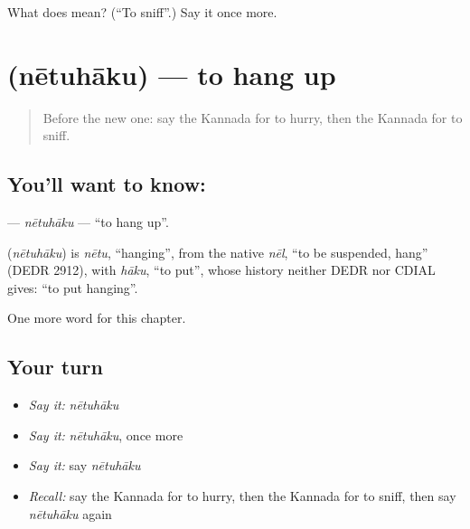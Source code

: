 \begin{tcolorbox}[breakable,colback=teal!4,colframe=teal!35!black,title={Before you move on}]
What does  mean? (\textquotedblleft{}To sniff\textquotedblright{}.) Say it once more.
\end{tcolorbox}
\section[\texorpdfstring{\kn{ನೇತುಹಾಕು} (nētuhāku)}{ನೇತುಹಾಕು (nētuhāku)}]{ (nētuhāku) — to hang up}

\label{lesson:KA-C207-netuhaku}



\begin{quote}
Before the new one: say the Kannada for to hurry, then the Kannada for to sniff.
\end{quote}

\subsection*{You'll want to know: }
\textbf{} — \emph{nētuhāku} — \textquotedblleft{}to hang up\textquotedblright{}.

\begin{cousinweb}
\textbf{} (\emph{nētuhāku}) is \emph{nētu}, \textquotedblleft{}hanging\textquotedblright{}, from the native \emph{nēl}, \textquotedblleft{}to be suspended, hang\textquotedblright{} (DEDR 2912), with \emph{hāku}, \textquotedblleft{}to put\textquotedblright{}, whose history neither DEDR nor CDIAL gives: \textquotedblleft{}to put hanging\textquotedblright{}.
\end{cousinweb}

\begin{grammarlens}[title={What you've built}]
One more word for this chapter.
\end{grammarlens}

\subsection*{Your turn}
\begin{itemize}
\raggedright
  \item \emph{Say it:} \emph{nētuhāku}
  \item \emph{Say it:} \emph{nētuhāku}, once more
  \item \emph{Say it:} say \emph{nētuhāku}
  \item \emph{Recall:} say the Kannada for to hurry, then the Kannada for to sniff, then say \emph{nētuhāku} again
\end{itemize}

